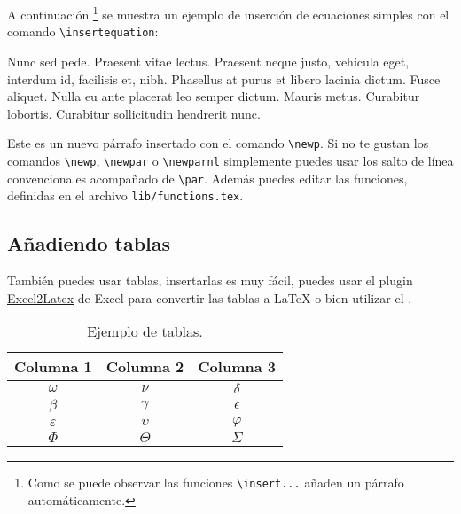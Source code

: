 		A continuación \footnote{Como se puede observar las funciones \texttt{\textbackslash insert...} añaden un párrafo automáticamente.} se muestra un ejemplo de inserción de ecuaciones simples con el comando \texttt{\textbackslash insertequation}:
		
		
		Nunc sed pede. Praesent vitae lectus. Praesent neque justo, vehicula eget, interdum id, facilisis et, nibh. Phasellus at purus et libero lacinia dictum. Fusce aliquet. Nulla eu ante placerat leo semper dictum. Mauris metus. Curabitur lobortis. Curabitur sollicitudin hendrerit nunc.
		
		\newp Este es un nuevo párrafo insertado con el comando \texttt{\textbackslash newp}. Si no te gustan los comandos \texttt{\textbackslash newp}, \texttt{\textbackslash newpar} o \texttt{\textbackslash newparnl} simplemente puedes usar los salto de línea convencionales acompañado de \texttt{\textbackslash par}. Además puedes editar las funciones, definidas en el archivo \texttt{lib/functions.tex}.
		
	\subsection{Añadiendo tablas}
		
		También puedes usar tablas, insertarlas es muy fácil, puedes usar el plugin \href{https://www.ctan.org/tex-archive/support/excel2latex/}{Excel2Latex} \cite{ref2} de Excel para convertir las tablas a \LaTeX\xspace o bien utilizar el  \cite{ref3}.
		
		\begin{table}[htbp]
			\centering
			\caption{Ejemplo de tablas.}
			\begin{tabular}{ccc}
				\hline
				\textbf{Columna 1} & \textbf{Columna 2} & \textbf{Columna 3} \bigstrut\\
				\hline
				$\omega$ & $\nu$ & $\delta$ \bigstrut[t]\\
				$\beta$ & $\gamma$ & $\epsilon$ \\
				$\varepsilon$ & $\upsilon$ & $\varphi$\\
				$\Phi$ & $\Theta$ & $\varSigma$ \bigstrut[b]\\
				\hline
			\end{tabular}
			\label{tab:tabla-1}
		\end{table}

